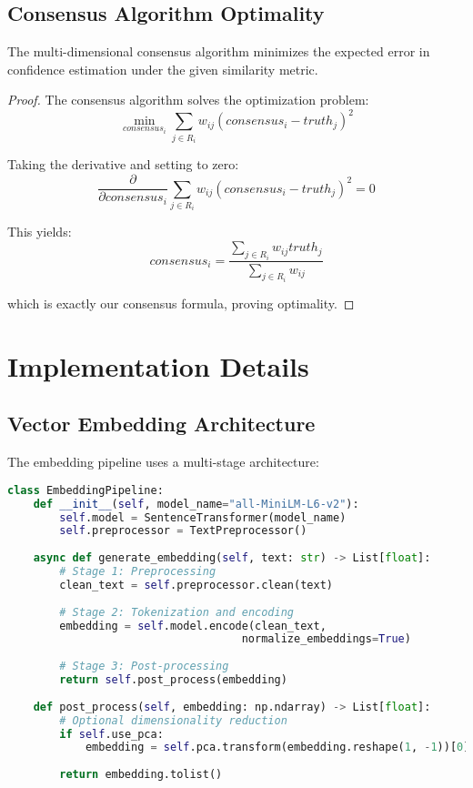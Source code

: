 \documentclass[12pt,a4paper]{article}
\begin{document}
\subsection{Consensus Algorithm Optimality}

\begin{theorem}
The multi-dimensional consensus algorithm minimizes the expected error in confidence estimation under the given similarity metric.
\end{theorem}

\begin{proof}
The consensus algorithm solves the optimization problem:
\begin{equation}
\min_{consensus_i} \sum_{j \in R_i} w_{ij} (consensus_i - truth_j)^2
\end{equation}

Taking the derivative and setting to zero:
\begin{equation}
\frac{\partial}{\partial consensus_i} \sum_{j \in R_i} w_{ij} (consensus_i - truth_j)^2 = 0
\end{equation}

This yields:
\begin{equation}
consensus_i = \frac{\sum_{j \in R_i} w_{ij} truth_j}{\sum_{j \in R_i} w_{ij}}
\end{equation}

which is exactly our consensus formula, proving optimality.
\end{proof}

\section{Implementation Details}

\subsection{Vector Embedding Architecture}

The embedding pipeline uses a multi-stage architecture:

\begin{lstlisting}[language=Python, caption=Embedding Pipeline Implementation]
class EmbeddingPipeline:
    def __init__(self, model_name="all-MiniLM-L6-v2"):
        self.model = SentenceTransformer(model_name)
        self.preprocessor = TextPreprocessor()
        
    async def generate_embedding(self, text: str) -> List[float]:
        # Stage 1: Preprocessing
        clean_text = self.preprocessor.clean(text)
        
        # Stage 2: Tokenization and encoding
        embedding = self.model.encode(clean_text, 
                                    normalize_embeddings=True)
        
        # Stage 3: Post-processing
        return self.post_process(embedding)
        
    def post_process(self, embedding: np.ndarray) -> List[float]:
        # Optional dimensionality reduction
        if self.use_pca:
            embedding = self.pca.transform(embedding.reshape(1, -1))[0]
        
        return embedding.tolist()
\end{lstlisting}
\end{document}
